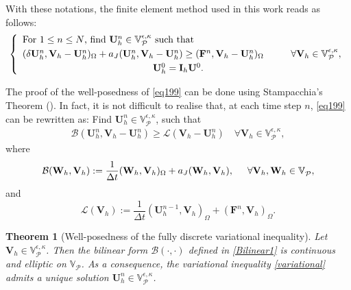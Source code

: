 \documentclass[final,12pt]{amsart}
\theoremstyle{plain}
\newtheorem{theorem}{Theorem}[section]
\theoremstyle{definition}
\newcommand\calP{{\mathcal{P}}}
\newcommand\bV{\mathbf{V}}
\newcommand\bW{\mathbf{W}}
\begin{document}
With these notations, the finite element method used in this work reads as follows:
\begin{equation}
	\left\{ \begin{array}{ll}
		\text{For $1\leq n \leq N$, find $\mathbf{U}_h^n \in \mathbb{V}_{\calP}^{\epsilon,\kappa}$ such that}\vspace{.1cm}
		\\  
		(\delta \mathbf{U}_{h}^{n},\mathbf{V}_{h}-\mathbf{U}_{h}^{n})_{\Omega} + a_{J}(\mathbf{U}_{h}^{n},\mathbf{V}_{h}-\mathbf{U}_{h}^{n}) \geq (\mathbf{F}^{n},\mathbf{V}_{h}-\mathbf{U}_{h}^{n})_{\Omega} \hspace{1cm} \forall \mathbf{V}_{h}\in \mathbb{V}_{\calP}^{\epsilon,\kappa}, \vspace{.1cm}\\
		\hspace{4.8cm} \mathbf{U}_{h}^{0} = \mathbf{I}_{h}\mathbf{U}^{0} .
	\end{array} \right.\label{eq199}
\end{equation}

The proof of the well-posedness of \eqref{eq199} can be done using Stampacchia's Theorem (\cite[Theorem~2.1]{Stampacchia}).  In fact, it is not difficult to realise that, at each time step $n$, \eqref{eq199} can be rewritten as: Find $\mathbf{U}_h^n \in \mathbb{V}_{\calP}^{\epsilon,\kappa}$, such that
\begin{align}
	\mathcal{B}(\mathbf{U}_h^n, \mathbf{V}_h - \mathbf{U}_h^n) \geq \mathcal{L}(\mathbf{V}_h - \mathbf{U}_h^n) \quad \forall \mathbf{V}_{h}\in \mathbb{V}_{\calP}^{\epsilon,\kappa},\label{variational}
\end{align}
where
\begin{equation}
	\mathcal{B}(\mathbf{W}_h, \mathbf{V}_h) := \frac{1}{\Delta t}(\mathbf{W}_h, \mathbf{V}_h)_{\Omega} +  a_J(\mathbf{W}_h, \mathbf{V}_h),\hspace{0.5cm} \forall \bV_{h}, \bW_{h}\in \mathbb{V}_{\calP}^{}, \label{Bilinear1}
\end{equation}
and 
\begin{equation}
	\mathcal{L}(\mathbf{V}_h) := \frac{1}{\Delta t}(\mathbf{U}_h^{n-1}, \mathbf{V}_h)_{\Omega} + (\mathbf{F}^{n}, \mathbf{V}_h)_{\Omega}.\label{linear1} 
\end{equation}

\begin{theorem}[Well-posedness of the fully discrete variational inequality]
	Let $\mathbf{V}_h \in \mathbb{V}_{\calP}^{\epsilon,\kappa}$.  
	Then the bilinear form $\mathcal{B}(\cdot,\cdot)$ defined in \eqref{Bilinear1} 
	is continuous and elliptic on $\mathbb{V}_{\calP}$.  
	As a consequence, the variational inequality \eqref{variational} admits a unique solution 
	$\mathbf{U}_h^n \in \mathbb{V}_{\calP}^{\epsilon,\kappa}$.
\end{theorem}
\end{document}
